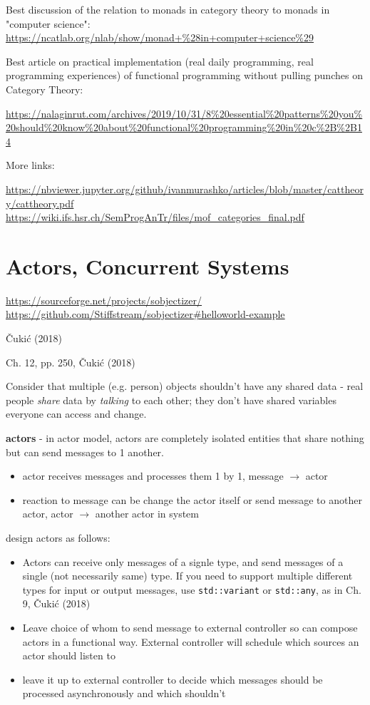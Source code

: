 \documentclass[10pt]{amsart}
\begin{document}
\begin{multicols*}{2}
Best discussion of the relation to monads in category theory to monads in "computer science": \url{https://ncatlab.org/nlab/show/monad+%28in+computer+science%29}

Best article on practical implementation (real daily programming, real programming experiences) of functional programming without pulling punches on Category Theory:

\url{https://nalaginrut.com/archives/2019/10/31/8%20essential%20patterns%20you%20should%20know%20about%20functional%20programming%20in%20c%2B%2B14}

More links:

\url{https://nbviewer.jupyter.org/github/ivanmurashko/articles/blob/master/cattheory/cattheory.pdf}
\url{https://wiki.ifs.hsr.ch/SemProgAnTr/files/mof_categories_final.pdf}

\section{Actors, Concurrent Systems}

\url{https://sourceforge.net/projects/sobjectizer/}
\url{https://github.com/Stiffstream/sobjectizer#helloworld-example}

\v{C}uki\'{c} (2018) \cite{Cuki2018}

Ch. 12, pp. 250, \v{C}uki\'{c} (2018) \cite{Cuki2018}

Consider that multiple (e.g. person) objects shouldn't have any shared data - real people \emph{share} data by \emph{talking} to each other; they don't have shared variables everyone can access and change.

\textbf{actors} - in actor model, actors are completely isolated entities that share nothing but can send messages to 1 another.
\begin{itemize}
	\item actor receives messages and processes them 1 by 1, message $\to$ actor
	\item reaction to message can be change the actor itself or send message to another actor, actor $\to $ another actor in system
\end{itemize}

design actors as follows:

\begin{itemize}
	\item Actors can receive only messages of a signle type, and send messages of a single (not necessarily same) type. If you need to support multiple different types for input or output messages, use \verb|std::variant| or \verb|std::any|, as in Ch. 9, \v{C}uki\'{c} (2018) \cite{Cuki2008}
	\item Leave choice of whom to send message to external controller so can compose actors in a functional way. External controller will schedule which sources an actor should listen to
	\item leave it up to external controller to decide which messages should be processed asynchronously and which shouldn't
\end{itemize}


\end{multicols*}
\end{document}
